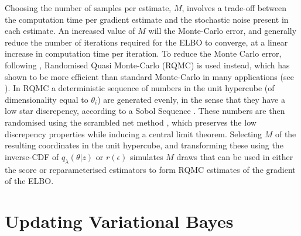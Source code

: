 \documentclass[12pt,a4paper]{article}\usepackage[]{graphicx}\usepackage[]{color}
\begin{document}
Choosing the number of samples per estimate, $M$, involves a trade-off between the computation time per gradient estimate and the stochastic noise present in each estimate. An increased value of $M$ will the Monte-Carlo error, and generally reduce the number of iterations required for the ELBO to converge, at a linear increase in computation time per iteration. To reduce the Monte Carlo error, following \citet{Gunawan2017}, Randomised Quasi Monte-Carlo (RQMC) is used instead, which has shown to be more efficient than standard Monte-Carlo in many applications (see \cite{Niederreiter1992, Caflisch1998}). In RQMC a deterministic sequence of numbers in the unit hypercube (of dimensionality equal to $\theta_i$) are generated evenly, in the sense that they have a low star discrepency, according to a Sobol Sequence \citep{Sobol1967}. These numbers are then randomised using the scrambled net method \citep{Matousek1998}, which preserves the low discrepency properties while inducing a central limit theorem. Selecting $M$ of the resulting coordinates in the unit hypercube, and transforming these using the inverse-CDF of $q_{\lambda}(\theta | z)$ or $r(\epsilon)$ simulates $M$ draws that can be used in either the score or reparameterised estimators to form RQMC estimates of the gradient of the ELBO.

\section{Updating Variational Bayes}
\label{sec:UVB}
\end{document}

